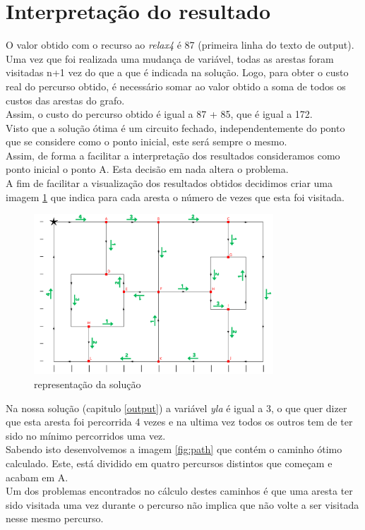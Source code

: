 \documentclass[a4paper]{report}
\begin{document}
\section{Interpretação do resultado}
\label{solution}
O valor obtido com o recurso ao \textit{relax4} é 87 (primeira linha do texto de
output). Uma vez que foi realizada uma mudança de variável, todas as arestas
foram visitadas n+1 vez do que a que é indicada na solução. Logo, para obter o
custo real do percurso obtido, é necessário somar ao valor obtido a soma de
todos os custos das arestas do grafo.\\
Assim, o custo do percurso obtido é igual a 87 + 85, que é igual a 172.\\
Visto que a solução ótima é um circuito fechado, independentemente do ponto
que se considere como o ponto inicial, este será sempre o mesmo. \\
Assim, de forma a facilitar a interpretação dos resultados consideramos como
ponto inicial o ponto A. Esta decisão em nada altera o problema.\\
A fim de facilitar a visualização dos resultados obtidos decidimos criar uma
imagem \ref{fig:visited} que indica para cada aresta o número de vezes que esta
foi visitada.

\begin{figure}[H]
    \begin{center}
        \includegraphics[width=0.8\textwidth]{images/desafioVisited.png}\par
        \caption{representação da solução}
        \label{fig:visited}
    \end{center}
\end{figure}
Na nossa solução (capitulo \ref{output}) a variável \textit{yla} é igual a 3, o
que quer dizer que esta aresta foi percorrida 4 vezes e na ultima vez todos os
outros tem de ter sido no mínimo percorridos uma vez.\\
Sabendo isto desenvolvemos a imagem \ref{fig:path} que contém o caminho ótimo
calculado. Este, está dividido em quatro percursos distintos que começam e
acabam em A.\\
Um dos problemas encontrados no cálculo destes caminhos é que uma aresta ter
sido visitada uma vez durante o percurso não implica que não volte a ser
visitada nesse mesmo percurso.
\end{document}

